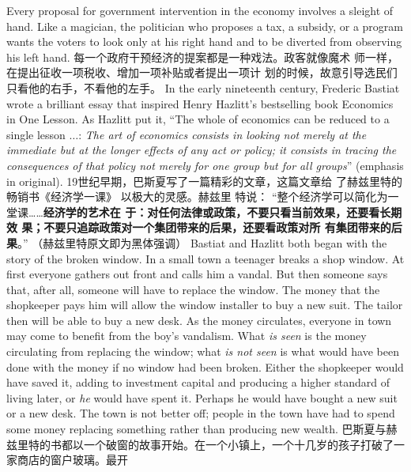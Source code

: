 \begin{paracol}{2}
Every proposal for government intervention in the economy involves a sleight of hand. Like a magician, the politician who proposes a tax, a subsidy, or a program wants the voters to look only
at his right hand and to be diverted from observing his left hand.
\switchcolumn
每一个政府干预经济的提案都是一种戏法。政客就像魔术
师一样，在提出征收一项税收、增加一项补贴或者提出一项计
划的时候，故意引导选民们只看他的右手，不看他的左手。
\switchcolumn*
In the early nineteenth century, Frederic Bastiat wrote a brilliant essay that inspired Henry Hazlitt's bestselling book Economics in One Lesson. As Hazlitt put it, ``The whole of economics
can be reduced to a single lesson $\ldots$: \textit{The art \textit{of economics consists in looking not merely at the immediate but at the longer effects of any act or policy; it consists in tracing the consequences of that policy not merely for one group but for all groups}}'' (emphasis in original).
\switchcolumn
19世纪早期，巴斯夏写了一篇精彩的文章，这篇文章给
了赫兹里特的畅销书《经济学一课》 以极大的灵感。赫兹里
特说： “整个经济学可以简化为一堂课……\textbf{经济学的艺术在
于：对任何法律或政策，不要只看当前效果，还要看长期效
果；不要只追踪政策对一个集团带来的后果，还要看政策对所
有集团带来的后果}。” （赫兹里特原文即为黑体强调）
\switchcolumn*
Bastiat and Hazlitt both began with the story of the broken
window. In a small town a teenager breaks a shop window. At
first everyone gathers out front and calls him a vandal. But then
someone says that, after all, someone will have to replace the
window. The money that the shopkeeper pays him will allow
the window installer to buy a new suit. The tailor then will be
able to buy a new desk. As the money circulates, everyone in
town may come to benefit from the boy's vandalism. What \textit{is seen} is the money circulating from replacing the window; what \textit{is not seen} is what would have been done with the money if no window had been broken. Either the shopkeeper would have saved
it, adding to investment capital and producing a higher standard of living later, or \textit{he} would have spent it. Perhaps he would have bought a new suit or a new desk. The town is not better off; people in the town have had to spend some money replacing something rather than producing new wealth.
\switchcolumn
巴斯夏与赫兹里特的书都以一个破窗的故事开始。在一个小镇上，一个十几岁的孩子打破了一家商店的窗户玻璃。最开

\end{paracol}
